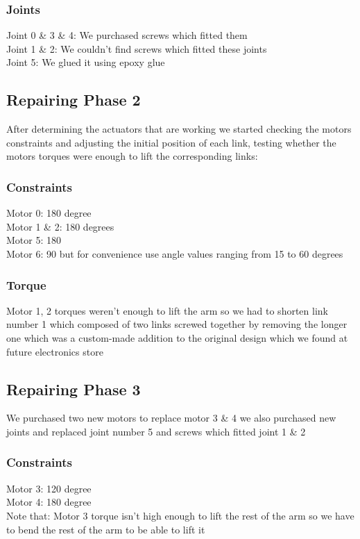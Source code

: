 \documentclass[11pt,a4paper]{report}
\begin{document}
\subsubsection{Joints}
Joint 0 \& 3 \& 4: We purchased screws which fitted them\\
Joint 1 \& 2: We couldn't find screws which fitted these joints \\ 
Joint 5: We glued it using epoxy glue
\subsection{Repairing Phase 2}
After determining the actuators that are working we started checking the motors constraints and adjusting the initial position of each link, testing whether the motors torques were enough to lift the corresponding links:\\
\subsubsection{Constraints}
Motor 0: 180 degree\\
Motor 1 \& 2: 180 degrees\\
Motor 5: 180\\
Motor 6: 90 but for convenience use angle values ranging from 15 to 60 degrees\\
\subsubsection{Torque}
Motor 1, 2 torques weren't enough to lift the arm so we had to shorten link number 1 which composed of two links screwed together by removing the longer one which was a custom-made addition to the original design which we found at future electronics store \cite{datasheet}
\subsection{Repairing Phase 3}
We purchased two new motors to replace motor 3 \& 4 we also purchased new joints and replaced joint number 5 and screws which fitted joint 1 \& 2
\subsubsection{Constraints}
Motor 3: 120 degree\\
Motor 4: 180 degree\\
Note that: Motor 3 torque isn't high enough to lift the rest of the arm so we have to bend the rest of the arm to be able to lift it 
\end{document}
